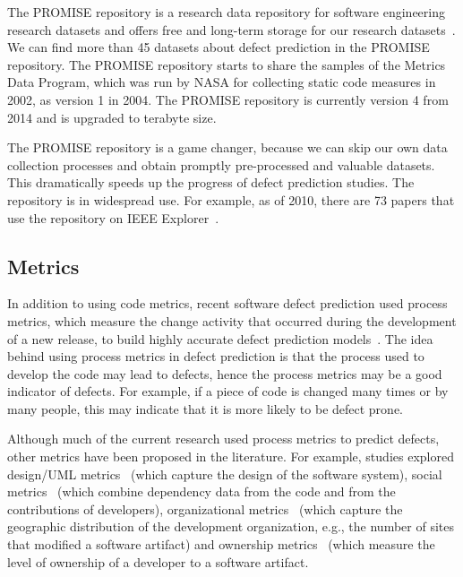 \begin{oframed}
\vspace{-0.2cm}
The PROMISE repository is a research data repository for software engineering research datasets and offers free and long-term storage for our research datasets~\cite{promiserepo}.
We can find more than 45 datasets about defect prediction in the PROMISE repository.
The PROMISE repository starts to share the samples of the Metrics Data Program, which was run by NASA for collecting static code measures in 2002, as version 1 in 2004.
The PROMISE repository is currently version 4 from 2014 and is upgraded to terabyte size.

The PROMISE repository is a game changer, because we can skip our own data collection processes and obtain promptly pre-processed and valuable datasets.
This dramatically speeds up the progress of defect prediction studies. 
The repository is in widespread use. For example, as of 2010, there are 73 papers that use the repository on IEEE Explorer~\cite{promiserepo}.
\end{oframed}

\subsection{Metrics}

In addition to using code metrics, recent software defect prediction used process metrics, which measure the change activity that occurred during the development of a new release, to build highly accurate defect prediction models~\cite{NagappanICSE05_2,Moser2008ICSE}. The idea behind using process metrics in defect prediction is that the process used to develop the code may lead to defects, hence the process metrics may be a good indicator of defects. For example, if a piece of code is changed many times or by many people, this may indicate that it is more likely to be defect prone.

Although much of the current research used process metrics to predict defects, other metrics have been proposed in the literature. For example, studies explored design/UML metrics~\cite{Briand2002TSE, Erika2010ICSE, Nugroho2010MSR} (which capture the design of the software system), social metrics~\cite{Bird2009ISSRE} (which combine dependency data from the code and from the contributions of developers), organizational metrics~\cite{Mockus2010FSE} (which capture the geographic distribution of the development organization, e.g., the number of sites that modified a software artifact) and ownership metrics~\cite{Bird2011FSE} (which measure the level of ownership of a developer to a software artifact.

